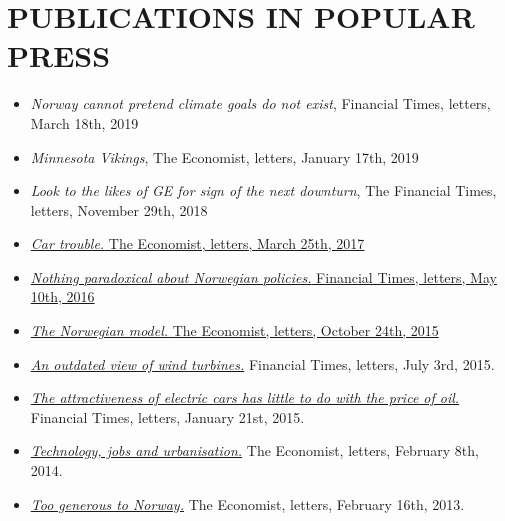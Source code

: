 \documentclass[margin]{res}
\begin{document}
\section{PUBLICATIONS IN POPULAR PRESS}
\begin{itemize}
\setlength{\itemsep}{5pt}

\item[] \emph{Norway cannot pretend climate goals do not exist}, Financial Times, letters, March 18th, 2019

\item[] \emph{Minnesota Vikings}, The Economist, letters, January 17th, 2019

\item[] \emph{Look to the likes of GE for sign of the next downturn}, The Financial Times, letters, November 29th, 2018

\item[] \href{https://www.economist.com/news/letters/21719426-liberia-charles-murray-france-turkey-electric-cars-dead-words-letters-editor}{\emph{Car trouble.} The Economist, letters, March 25th, 2017}

\item[] \href{https://next.ft.com/content/a9ca4ad4-15d8-11e6-9d98-00386a18e39d}{\emph{Nothing paradoxical about Norwegian policies.} Financial Times, letters, May 10th, 2016}

\item[] \href{http://www.economist.com/news/letters/21676738-letters}{\emph{The Norwegian model.} The Economist, letters, October 24th, 2015}

\item[] \href{http://www.ft.com/intl/cms/s/0/e22cba5c-1bfa-11e5-a130-2e7db721f996.html#axzz3giRBkRau}{\emph{An outdated view of wind turbines.}} Financial Times, letters, July 3rd, 2015.

\item[] \href{http://www.ft.com/intl/cms/s/0/313360bc-a00c-11e4-aa89-00144feab7de.html#axzz3PVKMfhY5}{\emph{The attractiveness of electric cars has little to do with the price of oil.}} Financial Times, letters, January 21st, 2015.

\item[] \href{http://www.economist.com/news/letters/21595871-livestock-and-emissions-california-technology-and-jobs-algorithms}{\emph{Technology, jobs and urbanisation.}}   The Economist, letters, February 8th, 2014.

\item[] \href{http://www.economist.com/news/letters/21571848-nordic-countries-private-schools-immigration-sandhurst-ed-koch-richard-iii}{\emph{Too generous to Norway.}} The Economist, letters, February 16th, 2013.


\end{itemize}
\end{document}
